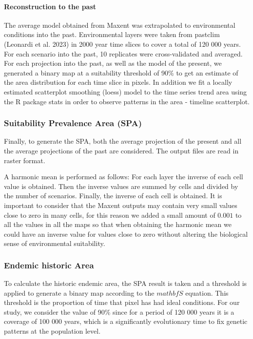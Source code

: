 \documentclass[
]{article}
\begin{document}
\hypertarget{reconstruction-to-the-past}{%
\paragraph{Reconstruction to the
past}\label{reconstruction-to-the-past}}

The average model obtained from Maxent was extrapolated to environmental
conditions into the past. Environmental layers were taken from pastclim
(Leonardi et al. 2023) in 2000 year time slices to cover a total of 120
000 years. For each scenario into the past, 10 replicates were
cross-validated and averaged. For each projection into the past, as well
as the model of the present, we generated a binary map at a suitability
threshold of 90\% to get an estimate of the area distribution for each
time slice in pixels. In addition we fit a locally estimated scatterplot
smoothing (loess) model to the time series trend area using the R
package stats in order to observe patterns in the area - timeline
scatterplot.

\hypertarget{suitability-prevalence-area-spa}{%
\subsubsection{Suitability Prevalence Area
(SPA)}\label{suitability-prevalence-area-spa}}

Finally, to generate the SPA, both the average projection of the present
and all the average projections of the past are considered. The output
files are read in raster format.

A harmonic mean is performed as follows: For each layer the inverse of
each cell value is obtained. Then the inverse values are summed by cells
and divided by the number of scenarios. Finally, the inverse of each
cell is obtained. It is important to consider that the Maxent outputs
may contain very small values close to zero in many cells, for this
reason we added a small amount of \(0.001\) to all the values in all the
maps so that when obtaining the harmonic mean we could have an inverse
value for values close to zero without altering the biological sense of
environmental suitability.

\hypertarget{endemic-historic-area}{%
\subsubsection{Endemic historic Area}\label{endemic-historic-area}}

To calculate the historic endemic area, the SPA result is taken and a
threshold is applied to generate a binary map according to the
\(mathbf{S}\) equation. This threshold is the proportion of time that
pixel has had ideal conditions. For our study, we consider the value of
90\% since for a period of 120 000 years it is a coverage of 100 000
years, which is a significantly evolutionary time to fix genetic
patterns at the population level.
\end{document}
